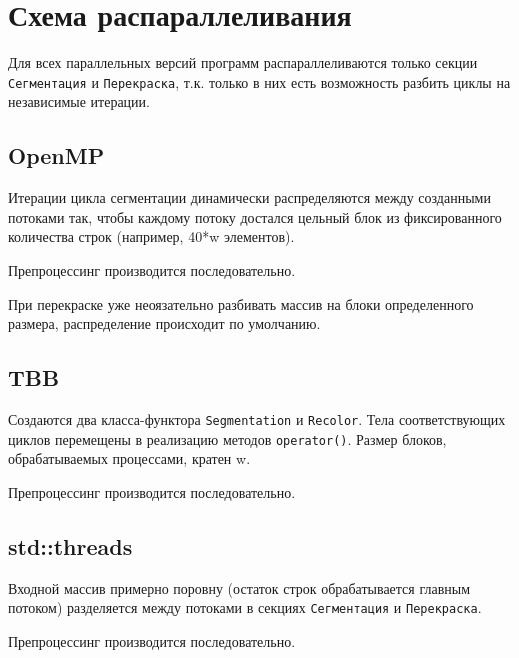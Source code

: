 \documentclass{report}
\begin{document}
\newpage

\section*{Схема распараллеливания}
Для всех параллельных версий программ распараллеливаются только секции \verb|Сегментация| и \verb|Перекраска|, т.к. только в них есть возможность разбить циклы на независимые итерации.
\subsection*{OpenMP}
Итерации цикла сегментации динамически распределяются между созданными потоками так, чтобы каждому потоку достался цельный блок из фиксированного количества строк (например, 40*w элементов).
\par Препроцессинг производится последовательно.
\par При перекраске уже неоязательно разбивать массив на блоки определенного размера, распределение происходит по умолчанию.

\subsection*{TBB}
Создаются два класса-функтора \verb|Segmentation| и \verb|Recolor|. Тела соответствующих циклов перемещены в реализацию методов \verb|operator()|. Размер блоков, обрабатываемых процессами, кратен w.
\par Препроцессинг производится последовательно.

\subsection*{std::threads}
Входной массив примерно поровну (остаток строк обрабатывается главным потоком) разделяется между потоками в секциях \verb|Сегментация| и \verb|Перекраска|.
\par Препроцессинг производится последовательно.

\newpage
\end{document}

